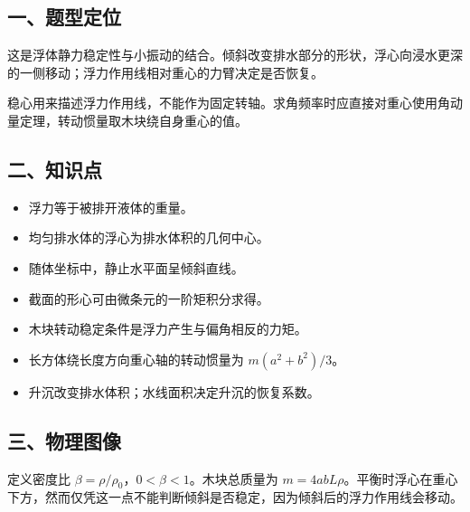 \documentclass[12pt,a4paper,fontset=fandol]{ctexart}
\providecommand{\tightlist}{\setlength{\itemsep}{0pt}\setlength{\parskip}{0pt}}
\begin{document}
\subsection{一、题型定位}\label{ux4e00ux9898ux578bux5b9aux4f4d-4}

这是浮体静力稳定性与小振动的结合。倾斜改变排水部分的形状，浮心向浸水更深的一侧移动；浮力作用线相对重心的力臂决定是否恢复。

稳心用来描述浮力作用线，不能作为固定转轴。求角频率时应直接对重心使用角动量定理，转动惯量取木块绕自身重心的值。

\subsection{二、知识点}\label{ux4e8cux77e5ux8bc6ux70b9-4}

\begin{itemize}
\tightlist
\item
  浮力等于被排开液体的重量。
\item
  均匀排水体的浮心为排水体积的几何中心。
\item
  随体坐标中，静止水平面呈倾斜直线。
\item
  截面的形心可由微条元的一阶矩积分求得。
\item
  木块转动稳定条件是浮力产生与偏角相反的力矩。
\item
  长方体绕长度方向重心轴的转动惯量为 \(m(a^2+b^2)/3\)。
\item
  升沉改变排水体积；水线面积决定升沉的恢复系数。
\end{itemize}

\subsection{三、物理图像}\label{ux4e09ux7269ux7406ux56feux50cf-4}

定义密度比 \(\beta=\rho/\rho_0\)，\(0<\beta<1\)。木块总质量为
\(m=4abL\rho\)。平衡时浮心在重心下方，然而仅凭这一点不能判断倾斜是否稳定，因为倾斜后的浮力作用线会移动。
\end{document}
